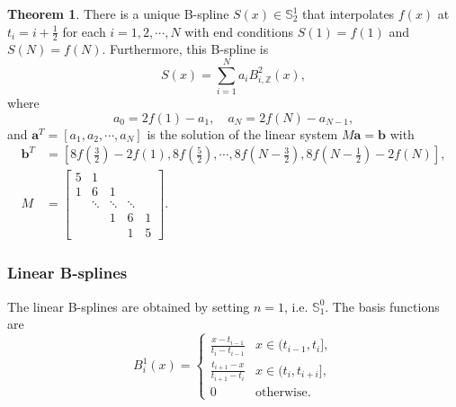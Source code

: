 \documentclass[a4paper]{article}
\theoremstyle{definition}
\newtheorem{theorem}{Theorem}
\begin{document}
\begin{theorem}
  There is a unique B-spline $S(x) \in \mathbb{S}_2^1$ that interpolates $f(x)$ at $t_i = i + \frac{1}{2}$ for each $i = 1, 2, \cdots, N$ with end conditions $S(1) = f(1)$ and $S(N) = f(N)$. Furthermore, this B-spline is 
  \begin{equation}
    S(x) = \sum_{i = 1}^N a_i B_{i, \mathbb{Z}}^2(x),
    \label{eq:cardinal-quadratic-b-spline-interpolation}
  \end{equation}
  where 
  \begin{equation}
    a_0 = 2f(1) - a_1,\quad a_N = 2f(N) - a_{N - 1},
    \label{eq:cardinal-quadratic-b-spline-coefficients}
  \end{equation}
  and $\mathbf{a}^T = [a_1, a_2, \cdots, a_N]$ is the solution of the linear system $M \mathbf{a} = \mathbf{b}$ with 
  \begin{equation}
    \begin{aligned}
      \mathbf{b}^T &= [8f(\frac{3}{2}) - 2f(1), 8f(\frac{5}{2}), \cdots, 8f(N - \frac{3}{2}), 8f(N - \frac{1}{2}) - 2f(N)], \\
      M &= \begin{bmatrix}
        5 & 1 &   &   &   \\
        1 & 6 & 1 &   &   \\
          & \ddots & \ddots & \ddots &   \\
          &   & 1 & 6 & 1 \\
          &   &   & 1 & 5
      \end{bmatrix}.
    \end{aligned}
    \label{eq:cardinal-quadratic-b-spline-linear-system}
  \end{equation}
  \label{thm:cardinal-quadratic-b-spline-interpolation}
\end{theorem}

\subsubsection{Linear B-splines}

The linear B-splines are obtained by setting $n = 1$, i.e. $\mathbb{S}_1^0$. The basis functions are 
\begin{equation}
  B_i^1(x) = \begin{cases}
    \frac{x - t_{i - 1}}{t_i - t_{i - 1}} & x \in (t_{i - 1}, t_i], \\
    \frac{t_{i + 1} - x}{t_{i + 1} - t_i} & x \in (t_i, t_{i + i}], \\
    0 & \text{otherwise}.
  \end{cases}
  \label{eq:linear-b-spline}
\end{equation}
\end{document}
